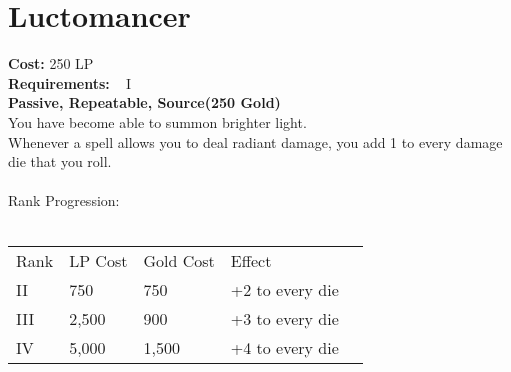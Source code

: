 \section{Luctomancer}\label{perk:luctomancer}
\textbf{Cost:} 250 LP\\
\textbf{Requirements:} ~ I\\
\textbf{Passive, Repeatable, Source(250 Gold)}\\
You have become able to summon brighter light.\\
Whenever a spell allows you to deal radiant damage, you add 1 to every damage die that you roll.\\
\\
Rank Progression:\\
\\
\begin{tabular}{l | l | l | l | l}
    Rank & LP Cost & Gold Cost &  Effect\\
    II & 750 & 750 & +2 to every die\\
    III & 2,500 & 900 & +3 to every die\\
    IV & 5,000 & 1,500 & +4 to every die\\
\end{tabular}